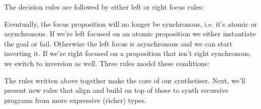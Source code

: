 \documentclass{llncs}
\newcommand{\lolli}{\multimap}
\newcommand{\tensor}{\otimes}
\newcommand{\bang}{{!}}
\begin{document}
The decision rules are followed by either left or right focus rules:
%
Eventually, the focus proposition will no longer be synchronous, i.e. it's
atomic or asynchronous. If we're left focused on an atomic proposition we either
instantiate the goal or fail. Otherwise the left focus is asynchronous and we
can start inverting it. If we're right focused on a proposition that isn't right
synchronous, we switch to inversion as well. Three rules model these conditions:
%
The rules written above together make the core of our synthetiser. Next, we'll
present new rules that align and build on top of these to synth recursive
programs from more expressive (richer) types.
\end{document}
